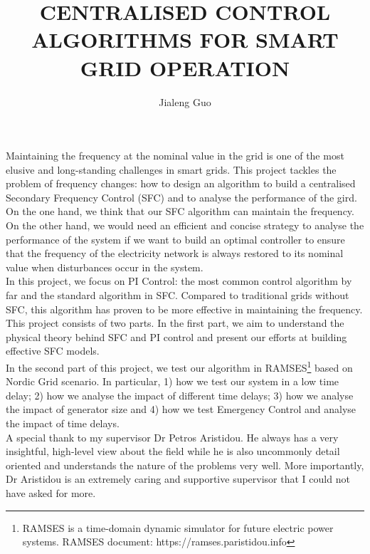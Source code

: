 \documentclass{report}
\begin{document}
\title{CENTRALISED CONTROL ALGORITHMS FOR SMART GRID OPERATION}
\author{Jialeng Guo}

\beforepreface
{}
Maintaining the frequency at the nominal value in the grid is one of the most elusive and long-standing challenges in smart grids. This project tackles the problem of frequency changes: how to design an algorithm to build a centralised Secondary Frequency Control (SFC) and to analyse the performance of the gird. On the one hand, we think that our SFC algorithm can maintain the frequency. On the other hand, we would need an efficient and concise strategy to analyse the performance of the system if we want to build an optimal controller to ensure that the frequency of the electricity network is always restored to its nominal value when disturbances occur in the system.\\

In this project, we focus on PI Control: the most common control algorithm by far and the standard algorithm in SFC. Compared to traditional grids without SFC, this algorithm has proven to be more effective in maintaining the frequency.\\

This project consists of two parts. In the first part, we aim to understand the physical theory behind SFC and PI control and present our efforts at building effective SFC models.\\

In the second part of this project, we test our algorithm in RAMSES\textcolor{red}{\footnote{RAMSES is a time-domain dynamic simulator for future electric power systems. RAMSES document: https://ramses.paristidou.info}} based on Nordic Grid scenario. In particular, 1) how we test our system in a low time delay; 2) how we analyse the impact of different time delays; 3) how we analyse the impact of generator size and 4) how we test Emergency Control and analyse the impact of time delays.\\

A special thank to my supervisor Dr Petros Aristidou. He always has a very insightful, high-level view about the ﬁeld while he is also uncommonly detail oriented and understands the nature of the problems very well. More importantly, Dr Aristidou is an extremely caring and supportive supervisor that I could not have asked for more.\\
\end{document}
